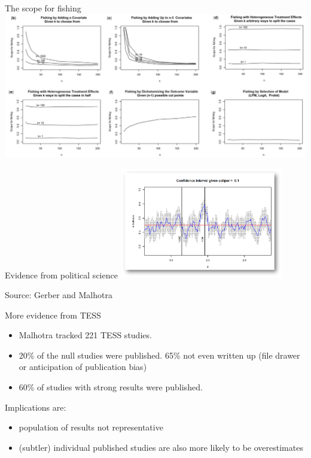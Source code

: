 \documentclass[
  11pt,
  ignorenonframetext,
]{beamer}
\providecommand{\tightlist}{%
  \setlength{\itemsep}{0pt}\setlength{\parskip}{0pt}}\usepackage{longtable,booktabs,array}
\begin{document}
\begin{frame}{The scope for fishing}
\protect\hypertarget{the-scope-for-fishing}{}
\includegraphics[width=6.98in,height=\textheight]{assets/fishing.png}
\end{frame}

\begin{frame}{Evidence from political science}
\protect\hypertarget{evidence-from-political-science}{}
\includegraphics[width=2.82in,height=\textheight]{assets/hack.png}

Source: Gerber and Malhotra
\end{frame}

\begin{frame}{More evidence from TESS}
\protect\hypertarget{more-evidence-from-tess}{}
\begin{itemize}
\tightlist
\item
  Malhotra tracked 221 TESS studies.
\item
  20\% of the null studies were published. 65\% not even written up
  (file drawer or anticipation of publication bias)
\item
  60\% of studies with strong results were published.
\end{itemize}

Implications are:

\begin{itemize}
\tightlist
\item
  population of results not representative
\item
  (subtler) individual published studies are also more likely to be
  overestimates
\end{itemize}
\end{frame}
\end{document}
